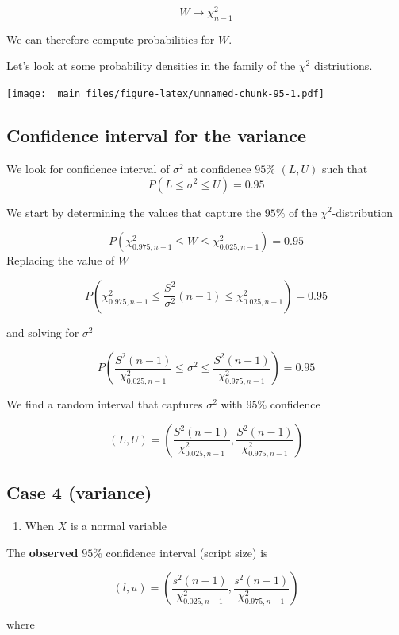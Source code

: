 \documentclass[
]{book}
\providecommand{\tightlist}{%
  \setlength{\itemsep}{0pt}\setlength{\parskip}{0pt}}
\begin{document}
\[W \rightarrow \chi^2_{n-1}\]

We can therefore compute probabilities for \(W\).

Let's look at some probability densities in the family of the \(\chi^2\) distriutions.

\texttt{[image: \_main\_files/figure-latex/unnamed-chunk-95-1.pdf]}

\hypertarget{confidence-interval-for-the-variance-1}{%
\subsection{Confidence interval for the variance}\label{confidence-interval-for-the-variance-1}}

We look for confidence interval of \(\sigma^2\) at confidence \(95\%\) \((L,U)\) such that \[P(L \leq \sigma^2 \leq U)=0.95\]

We start by determining the values that capture the \(95\%\) of the \(\chi^2\)-distribution

\[P(\chi^2_{0.975,n-1} \leq W \leq \chi^2_{0.025,n-1})=0.95\]
Replacing the value of \(W\)

\[P(\chi^2_{0.975,n-1} \leq \frac{S^2}{\sigma^2}(n-1) \leq \chi^2_{0.025,n-1})=0.95\]

and solving for \(\sigma^2\)

\[P(\frac{S^2 (n-1)}{\chi^2_{0.025,n-1}}\leq \sigma^2 \leq \frac{S^2(n-1)}{\chi^2_{0.975,n-1}})=0.95\]

We find a random interval that captures \(\sigma^2\)
with \(95\%\) confidence

\[(L,U) = (\frac{S^2 (n-1)}{\chi^2_{0.025,n-1}},\frac{S^2(n-1)}{\chi^2_{0.975,n-1}})\]

\hypertarget{case-4-variance}{%
\subsection{Case 4 (variance)}\label{case-4-variance}}

\begin{enumerate}
\def\labelenumi{\arabic{enumi}.}
\tightlist
\item
  When \(X\) is a normal variable
\end{enumerate}

The \textbf{observed} \(95\%\) confidence interval (script size) is

\[(l,u) = (\frac{s^2 (n-1)}{\chi^2_{0.025,n-1}},\frac{s^2(n-1)}{\chi^2_{0.975,n-1}})\]

where
\end{document}
